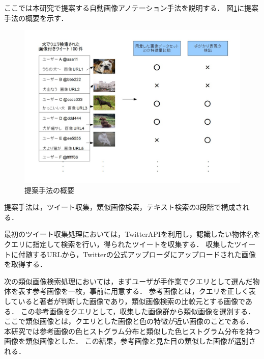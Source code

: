 \documentclass{deimj}
\begin{document}
ここでは本研究で提案する自動画像アノテーション手法を説明する．
図\ref{fig:way}に提案手法の概要を示す．
%
\begin{figure}[tb]
 \begin{center}
  \includegraphics[scale=0.29]{way.jpg}
 \end{center}
 \caption{提案手法の概要}
 \label{fig:way}
\end{figure}
%
提案手法は，ツイート収集，類似画像検索，テキスト検索の3段階で構成される．



最初のツイート収集処理においては，TwitterAPIを利用し，認識したい物体名をクエリに指定して検索を行い，得られたツイートを収集する．
収集したツイートに付随するURLから，Twitterの公式アップローダにアップロードされた画像を取得する．

次の類似画像検索処理においては，まずユーザが手作業でクエリとして選んだ物体を表す参考画像を一枚，事前に用意する．
参考画像とは，クエリを正しく表していると著者が判断した画像であり，類似画像検索の比較元とする画像である．
この参考画像をクエリとして，収集した画像群から類似画像を選別する．
ここで類似画像とは，クエリとした画像と色の特徴が近い画像のことである．
本研究では参考画像の色ヒストグラム分布と類似した色ヒストグラム分布を持つ画像を類似画像とした．
この結果，参考画像と見た目の類似した画像が選別される．
\end{document}
